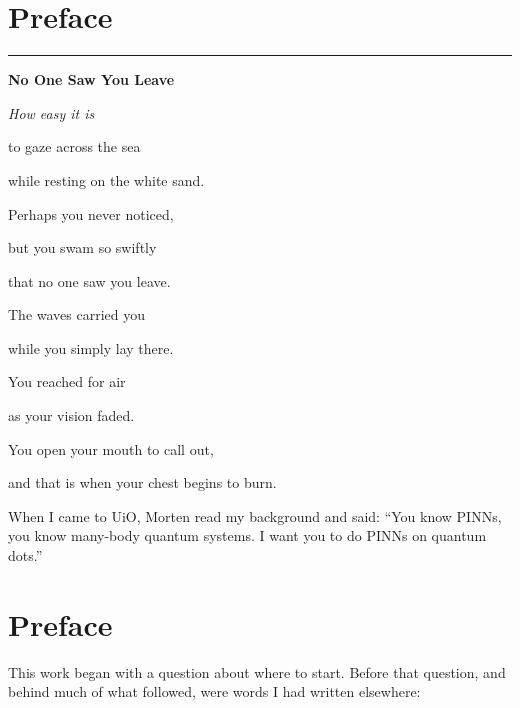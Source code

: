 \begingroup
\let\clearpage\relax
\let\cleardoublepage\relax
\chapter*{Preface}
\endgroup
{}

\vspace{1em}
\noindent
\begin{minipage}{0.035\textwidth}
\color{myaccent}\rule{1pt}{18em}
\end{minipage}%
\hfill
\begin{minipage}{0.88\textwidth}
\small
\textbf{No One Saw You Leave}\par\medskip
\itshape
How easy it is\par
to gaze across the sea\par
while resting on the white sand.\par\medskip
Perhaps you never noticed,\par
but you swam so swiftly\par
that no one saw you leave.\par\medskip
The waves carried you\par
while you simply lay there.\par
You reached for air\par
as your vision faded.\par\medskip
You open your mouth to call out,\par
and that is when your chest begins to burn.
\end{minipage}
\vspace{2em}

When I came to UiO, Morten read my background and said: ``You know PINNs, you know
many-body quantum systems. I want you to do PINNs on quantum dots.''



\begingroup
\let\clearpage\relax
\let\cleardoublepage\relax
\chapter*{Preface}
\endgroup
{}

This work began with a question about where to start. Before that question, and
behind much of what followed, were words I had written elsewhere:

